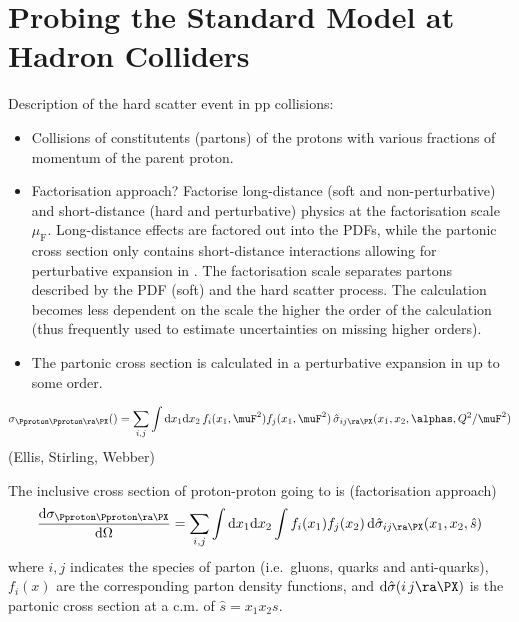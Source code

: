 \section{Probing the Standard Model at Hadron Colliders}

Description of the hard scatter event in pp collisions:
\begin{itemize}
\item Collisions of constitutents (partons) of the protons with
  various fractions of momentum of the parent proton.

\item Factorisation approach? Factorise long-distance (soft and
  non-perturbative) and short-distance (hard and perturbative) physics
  at the factorisation scale $\mu_\text{F}$. Long-distance effects are
  factored out into the PDFs, while the partonic cross section only
  contains short-distance interactions allowing for perturbative
  expansion in \alphas. The factorisation scale separates partons
  described by the PDF (soft) and the hard scatter process. The
  calculation becomes less dependent on the scale the higher the order
  of the calculation (thus frequently used to estimate uncertainties
  on missing higher orders).

\item The partonic cross section is calculated in a perturbative
  expansion in \alphas up to some order.
\end{itemize}

\begin{align*}
  \sigma_{\Pproton\Pproton \ra \PX}() = \sum_{i,j} \int \mathrm{d}x_1 \mathrm{d}x_2 \, f_i(x_1, \muF^2) f_j(x_1, \muF^2) \, \hat{\sigma}_{i j \ra \PX}(x_1, x_2, \alphas, Q^2 / \muF^2)
\end{align*}
(Ellis, Stirling, Webber)

The inclusive cross section of proton-proton going to \PX is (factorisation approach)
\begin{align*}
  \frac{\mathrm{d}\sigma_{\Pproton\Pproton \ra \PX}}{\mathrm{d}\Omega} = \sum_{i,j} \int \mathrm{d}x_1 \mathrm{d}x_2 \int f_i(x_1) f_j(x_2) \, \mathrm{d}\hat{\sigma}_{i j \ra \PX}(x_1, x_2, \hat{s})
\end{align*}
where $i, j$ indicates the species of parton (i.e.\ gluons, quarks and
anti-quarks), $f_i(x)$ are the corresponding parton density functions,
and $\mathrm{d}\hat{\sigma}(i\,j \ra \PX)$ is the partonic cross
section at a c.m. of $\hat{s} = x_1 x_2 s$.

